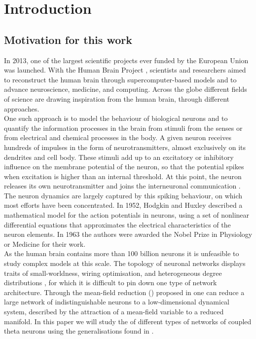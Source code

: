 \newpage
\section{Introduction}
\subsection{Motivation for this work}
In 2013, one of the largest scientific projects ever funded by the European Union was launched. With the Human Brain Project \cite{humanbrainproject}, scientists and researchers aimed to reconstruct the human brain through supercomputer-based models and to advance neuroscience, medicine, and computing. Across the globe different fields of science are drawing inspiration from the human brain, through different approaches. \\
One such approach is to model the behaviour of biological neurons and to quantify the information processes in the brain from stimuli from the senses or from electrical and chemical processes in the body. A given neuron receives hundreds of impulses in the form of neurotransmitters, almost exclusively on its dendrites and cell body. These stimuli add up to an excitatory or inhibitory influence on the membrane potential of the neuron, so that the potential spikes when excitation is higher than an internal threshold. At this point, the neuron releases its own neurotransmitter and joins the interneuronal communication \cite{IntroductionModelingDynamics}. The neuron dynamics are largely captured by this spiking behaviour, on which most efforts have been concentrated.
In 1952, Hodgkin and Huxley described a mathematical model for the action potentials in neurons, using a set of nonlinear differential equations that approximates the electrical characteristics of the neuron elements. In 1963 the authors were awarded the Nobel Prize in Physiology or Medicine \cite{nobel1963} for their work.\\

As the human brain contains more than 100 billion neurons \cite{Herculano2009} it is unfeasible to study complex models at this scale. The topology of neuronal networks displays traits of small-worldness, wiring optimisation, and heterogeneous degree distributions \cite{Bullmore2010}, for which it is difficult to pin down one type of network architecture. Through the mean-field reduction (\MFR) proposed in \cite{OttAntonsen2008} one can reduce a large network of indistinguishable neurons to a low-dimensional dynamical system, described by the attraction of a mean-field variable to a reduced manifold.
In this paper we will study the \MFR of different types of networks of coupled theta neurons using the generalisations found in \cite{OttAntonsen2017}. \\

